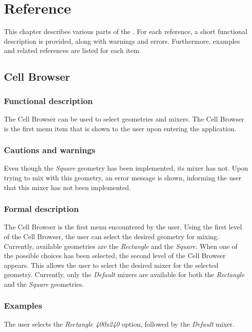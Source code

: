 \chapter{Reference}
This chapter describes various parts of the \applicationname{}. For each reference, a short functional description is provided, along with warnings and errors. Furthermore, examples and related references are listed for each item.

\section{Cell Browser}
\label{sec:cellBrows}
  \subsection*{Functional description}
  The Cell Browser can be used to select geometries and mixers. The Cell Browser is the first menu item that is shown to the user upon entering the application.
 
  \subsection*{Cautions and warnings}
  Even though the \emph{Square} geometry has been implemented, its mixer has not. Upon trying to mix with this geometry, an error message is shown, informing the user that this mixer has not been implemented.

  \subsection*{Formal description}
  The Cell Browser is the first menu encountered by the user. Using the first level of the Cell Browser, the user can select the desired geometry for mixing. Currently, available geometries are the \emph{Rectangle} and the \emph{Square}. When one of the possible choices has been selected, the second level of the Cell Browser appears. This allows the user to select the desired mixer for the selected geometry. Currently, only the \emph{Default} mixers are available for both the \emph{Rectangle} and the \emph{Square} geometries.
  
  \subsection*{Examples}
  The user selects the \emph{Rectangle 400x240} option, followed by the \emph{Default} mixer.

